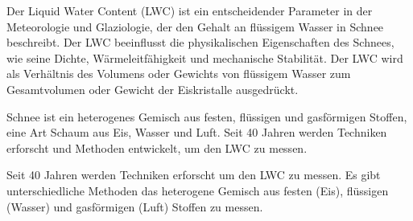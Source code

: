 Der Liquid Water Content (LWC) ist ein entscheidender Parameter in der Meteorologie und Glaziologie, der den Gehalt an flüssigem Wasser in Schnee beschreibt. Der LWC beeinflusst die physikalischen Eigenschaften des Schnees, wie seine Dichte, Wärmeleitfähigkeit und mechanische Stabilität. Der LWC wird als Verhältnis des Volumens oder Gewichts von flüssigem Wasser zum Gesamtvolumen oder Gewicht der Eiskristalle ausgedrückt.

Schnee ist ein heterogenes Gemisch aus festen, flüssigen und gasförmigen Stoffen, eine Art Schaum aus Eis, Wasser und Luft. Seit 40 Jahren werden Techniken erforscht und Methoden entwickelt, um den LWC zu messen. 

Seit 40 Jahren werden Techniken erforscht um den LWC zu messen. Es gibt unterschiedliche Methoden das heterogene Gemisch aus festen (Eis), flüssigen (Wasser) und gasförmigen (Luft) Stoffen zu messen.
